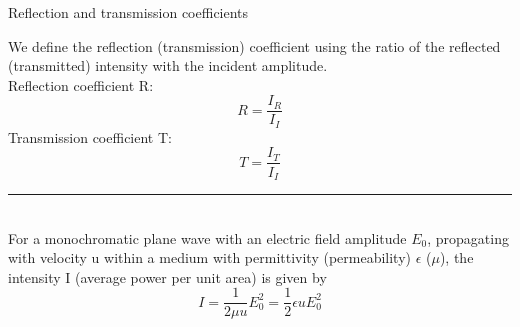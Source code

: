 %
%
%

\begin{frame}{Reflection and transmission coefficients}

We define the reflection (transmission) coefficient using the ratio of
the reflected (transmitted) intensity
with the incident amplitude.\\
\vspace{0.2cm}
Reflection coefficient R:
\begin{equation*}
   R = \frac{I_R}{I_I}
\end{equation*}
\vspace{0.2cm}
Transmission coefficient T:
\begin{equation*}
   T = \frac{I_T}{I_I}
\end{equation*}


\noindent\rule{2cm}{0.4pt}\\
{ \small
  For a monochromatic plane wave
  with an electric field amplitude $E_0$,
  propagating with velocity u within a medium with permittivity (permeability) $\epsilon$ ($\mu$),
  the intensity I  (average power per unit area) is given by
  \begin{equation*}
      I = \frac{1}{2\mu u} E_0^2 = \frac{1}{2} \epsilon u E_0^2
  \end{equation*}
}

\end{frame}

%
%
%

